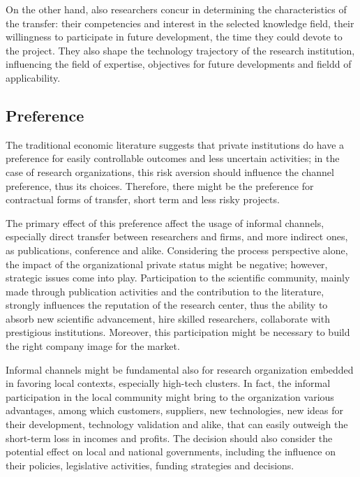 On the other hand, also researchers concur in determining the characteristics of the transfer: their competencies and interest in the selected knowledge field, their willingness to participate in future development, the time they could devote to the project. They also shape the technology trajectory of the research institution, influencing the field of expertise, objectives for future developments and fieldd of applicability.

\subsection{Preference}

The traditional economic literature suggests that private institutions do have a preference for easily controllable outcomes and less uncertain activities; in the case of research organizations, this risk aversion should influence the channel preference, thus its choices. Therefore, there might be the preference for contractual forms of transfer, short term and less risky projects.

The primary effect of this preference affect the usage of informal channels, especially direct transfer between researchers and firms, and more indirect ones, as publications, conference and alike. Considering the process perspective alone, the impact of the organizational private status might be negative; however, strategic issues come into play. Participation to the scientific community, mainly made through publication activities and the contribution to the literature, strongly influences the reputation of the research center, thus the ability to absorb new scientific advancement, hire skilled researchers, collaborate with prestigious institutions. Moreover, this participation might be necessary to build the right company image for the market.

Informal channels might be fundamental also for research organization embedded in favoring local contexts, especially high-tech clusters. In fact, the informal participation in the local community might bring to the organization various advantages, among which customers, suppliers, new technologies, new ideas for their development, technology validation and alike, that can easily outweigh the short-term loss in incomes and profits. The decision should also consider the potential effect on local and national governments, including the influence on their policies, legislative activities, funding strategies and decisions. 

